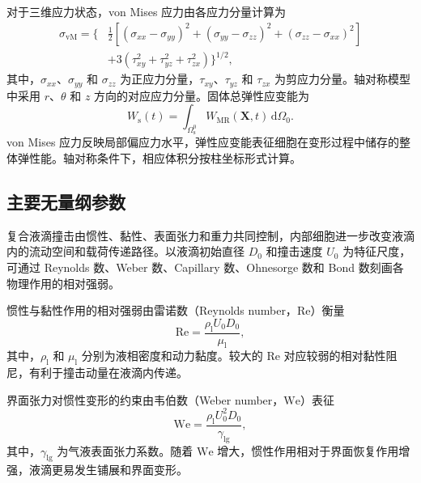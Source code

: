 对于三维应力状态，von Mises 应力由各应力分量计算为
\begin{equation}
\begin{aligned}
\sigma_{\mathrm{vM}}
=
\Bigg\{
&\frac{1}{2}
\left[
\left(\sigma_{xx}-\sigma_{yy}\right)^2
+
\left(\sigma_{yy}-\sigma_{zz}\right)^2
+
\left(\sigma_{zz}-\sigma_{xx}\right)^2
\right]
\\
&+
3\left(
\tau_{xy}^2
+
\tau_{yz}^2
+
\tau_{zx}^2
\right)
\Bigg\}^{1/2},
\end{aligned}
\label{eq:ch2_von_mises}
\end{equation}
其中，$\sigma_{xx}$、$\sigma_{yy}$ 和 $\sigma_{zz}$ 为正应力分量，$\tau_{xy}$、$\tau_{yz}$ 和 $\tau_{zx}$ 为剪应力分量。轴对称模型中采用 $r$、$\theta$ 和 $z$ 方向的对应应力分量。固体总弹性应变能为
\begin{equation}
W_{\mathrm s}(t)
=
\int_{\Omega_{\mathrm s}^0}
W_{\mathrm{MR}}(\boldsymbol{X},t)
\,\mathrm d\Omega_0.
\label{eq:ch2_total_strain_energy}
\end{equation}
von Mises 应力反映局部偏应力水平，弹性应变能表征细胞在变形过程中储存的整体弹性能。轴对称条件下，相应体积分按柱坐标形式计算。

\subsection{主要无量纲参数}
\label{subsec:ch2_dimensionless}

复合液滴撞击由惯性、黏性、表面张力和重力共同控制，内部细胞进一步改变液滴内的流动空间和载荷传递路径。以液滴初始直径 $D_0$ 和撞击速度 $U_0$ 为特征尺度，可通过 Reynolds 数、Weber 数、Capillary 数、Ohnesorge 数和 Bond 数刻画各物理作用的相对强弱。

惯性与黏性作用的相对强弱由雷诺数（Reynolds number，$\mathrm{Re}$）衡量
\begin{equation}
\mathrm{Re}
=
\frac{\rho_{\mathrm l}U_0D_0}{\mu_{\mathrm l}},
\label{eq:ch2_re}
\end{equation}
其中，$\rho_{\mathrm l}$ 和 $\mu_{\mathrm l}$ 分别为液相密度和动力黏度。较大的 $\mathrm{Re}$ 对应较弱的相对黏性阻尼，有利于撞击动量在液滴内传递。

界面张力对惯性变形的约束由韦伯数（Weber number，$\mathrm{We}$）表征
\begin{equation}
\mathrm{We}
=
\frac{\rho_{\mathrm l}U_0^2D_0}{\gamma_{\mathrm{lg}}},
\label{eq:ch2_we}
\end{equation}
其中，$\gamma_{\mathrm{lg}}$ 为气液表面张力系数。随着 $\mathrm{We}$ 增大，惯性作用相对于界面恢复作用增强，液滴更易发生铺展和界面变形。

